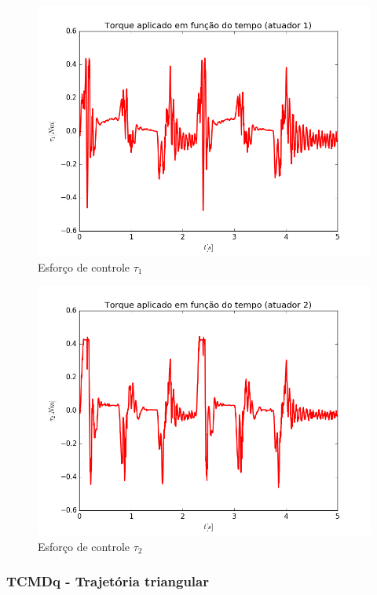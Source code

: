 \documentclass[]{politex}
\begin{document}
\begin{multicols}{2}
\begin{figure}[H]
	\centering
	\includegraphics[scale=0.39]{../../../Experimental/Aquisicoes/CTCt_triangulo/tau1.png}  
	\caption{Esforço de controle $\tau_1$}
	\label{fig:CTCq_triangulo_tau1}
\end{figure}
\begin{figure}[H]
	\centering
	\includegraphics[scale=0.39]{../../../Experimental/Aquisicoes/CTCt_triangulo/tau2.png}  
	\caption{Esforço de controle $\tau_2$}
	\label{fig:CTCq_triangulo_tau2}
\end{figure}
\end{multicols}

\subsubsection{TCMDq - Trajetória triangular}
\end{document}

